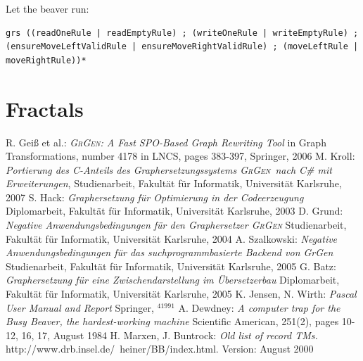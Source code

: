 \documentclass[a4paper,11pt]{report}
\providecommand{\GrG}{{\scshape GrGen}}
\begin{document}
Let the beaver run:
\begin{lstlisting}[name=bb]
  grs ((readOneRule | readEmptyRule) ; (writeOneRule | writeEmptyRule) ; (ensureMoveLeftValidRule | ensureMoveRightValidRule) ; (moveLeftRule | moveRightRule))*
\end{lstlisting}

\section{Fractals}

 R. Geiß et al.: \emph{\GrG: A Fast SPO-Based Graph Rewriting Tool} in Graph Transformations, number 4178 in LNCS, pages 383-397, Springer, 2006
 M. Kroll: \emph{Portierung des C-Anteils des Graphersetzungssystems \GrG\ nach C\# mit Erweiterungen}, Studienarbeit, Fakultät für Informatik, Universität Karlsruhe, 2007
 S. Hack: \emph{Graphersetzung für Optimierung in der Codeerzeugung} Diplomarbeit, Fakultät für Informatik, Universität Karlsruhe, 2003
 D. Grund: \emph{Negative Anwendungsbedingungen für den Graphersetzer \GrG} Studienarbeit, Fakultät für Informatik, Universität Karlsruhe, 2004 
 A. Szalkowski: \emph{Negative Anwendungsbedingungen für das suchprogrammbasierte Backend von GrGen} Studienarbeit, Fakultät für Informatik, Universität Karlsruhe, 2005
 G. Batz: \emph{Graphersetzung für eine Zwischendarstellung im Übersetzerbau} Diplomarbeit, Fakultät für Informatik, Universität Karlsruhe, 2005
 K. Jensen, N. Wirth: \emph{Pascal User Manual and Report} Springer, $^41991$
 A. Dewdney: \emph{A computer trap for the Busy Beaver, the hardest-working machine} Scientific American, 251(2), pages 10-12, 16, 17, August 1984
 H. Marxen, J. Buntrock: \emph{Old list of record TMs.}\\ http://www.drb.insel.de/~heiner/BB/index.html. Version: August 2000
\end{document}
